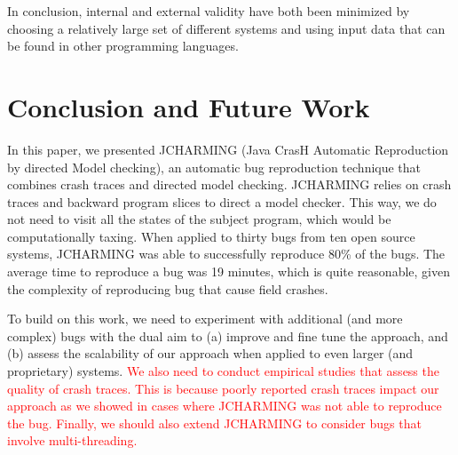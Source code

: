 \documentclass[times, doublespace]{smrauth}
\newcommand{\red}[1]{\textcolor{red}{#1}}
\begin{document}
In conclusion, internal and external validity have both been
minimized by choosing a relatively large set of different
systems and using input data that can be found in other
programming languages.

\section{Conclusion and Future Work\label{sec:conclusion}}

In this paper, we presented JCHARMING (Java CrasH Automatic
Reproduction by directed Model checking), an automatic bug
reproduction technique that combines crash traces and
directed model checking. JCHARMING relies on crash traces and backward program slices to direct a model checker. This way, we do not need to visit all the states of the subject program, which would be computationally taxing.  When applied to thirty bugs from ten open source systems, JCHARMING was able to successfully reproduce 80\% of the bugs. The average time to reproduce a bug was 19 minutes, which is quite reasonable, given the complexity of reproducing bug that cause field crashes.

To build on this work, we need to experiment with additional
(and more complex) bugs with the dual aim to (a) improve and
fine tune the approach, and (b) assess the scalability of our
approach when applied to even larger (and proprietary)
systems. \red{We also need to conduct empirical studies that assess the quality of crash traces. This is because poorly reported crash traces impact our approach as we showed in cases where JCHARMING was not able to reproduce the bug. Finally, we should also extend JCHARMING to consider bugs that involve multi-threading.}



\end{document}
